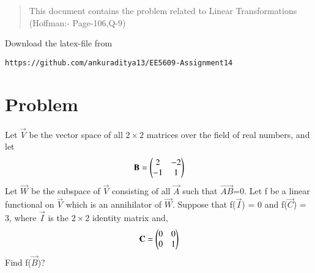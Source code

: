 \documentclass[journal,12pt,twocolumn]{IEEEtran}
\begin{document}
\begin{abstract}
This document contains the problem related to Linear Transformations (Hoffman:- Page-106,Q-9) 
\end{abstract}
Download the latex-file from 
\begin{lstlisting}
https://github.com/ankuraditya13/EE5609-Assignment14
\end{lstlisting}

\section{Problem}
Let $\vec{V}$ be the vector space of all $2\times 2$ matrices over the field of real numbers, and let
\begin{align}
\mathbf{B}= \begin{pmatrix}2&-2\\-1&1\end{pmatrix}
\end{align}  
Let $\vec{W}$ be the subspace of $\vec{V}$ consisting of all $\vec{A}$ such that $\vec{AB}$=0. Let f be a linear functional on $\vec{V}$ which is an annihilator of $\vec{W}$. Suppose that f($\vec{I}$) = 0 and f($\vec{C}$) = 3, where $\vec{I}$ is the $2\times 2$ identity matrix and,
\begin{align}
\mathbf{C} = \begin{pmatrix}0&0\\0&1\end{pmatrix}
\end{align} 
Find f($\vec{B}$)?
\end{document}
